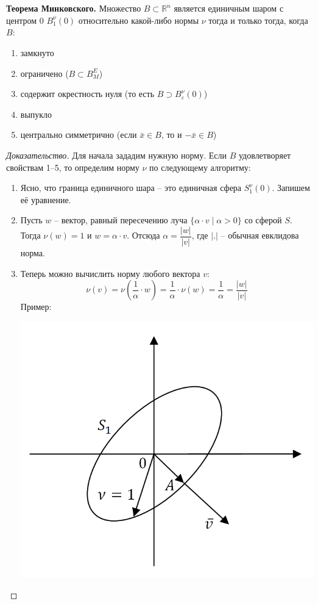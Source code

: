 \documentclass[12pt]{article}
\theoremstyle{definition}
\numberwithin{equation}{section}
\begin{document}
	\ \\
	\ \\
	
	\textbf{Теорема Минковского.}
	Множество $B \subset \mathbb{R}^n$ является единичным шаром с центром 0 $B_1^{\nu}(0)$ относительно какой-либо нормы $\nu$ тогда и только тогда, когда $B$:\begin{enumerate}
		\item замкнуто
		\item ограничено ($B \subset B_M^E$)
		\item содержит окрестность нуля (то есть $B \supset B_\varepsilon^\nu(0)$)
		\item выпукло
		\item центрально симметрично (если $\bar x \in B$, то и $-\bar x \in B$)
	\end{enumerate}
	\begin{proof}[Доказательство]
		 Для начала зададим нужную норму. Если $B$ удовлетворяет свойствам 1--5, то определим норму $\nu$ по следующему алгоритму:
		\begin{enumerate}
			\item Ясно, что граница единичного шара -- это единичная сфера $S_1^\nu(0)$. Запишем её уравнение.
			\item Пусть $w$ -- вектор, равный пересечению луча $\{\alpha\cdot v\mid \alpha > 0\}$ со сферой $S$. Тогда $\nu(w) = 1$ и $w = \alpha \cdot v$. Отсюда $\alpha = \dfrac{|w|}{|v|}$, где $|.|$ -- обычная евклидова норма.
			\item Теперь можно вычислить норму любого вектора $v$:
				\[\nu(v) = \nu\left(\dfrac{1}{\alpha}\cdot w\right) = \dfrac{1}{\alpha} \cdot \nu(w) = \dfrac{1}{\alpha} = \dfrac{|w|}{|v|}\]
			Пример:
			\begin{center}\includegraphics[scale=0.6]{l5_2.png}\\

\end{center}
\end{enumerate}
\end{proof}
\end{document}
